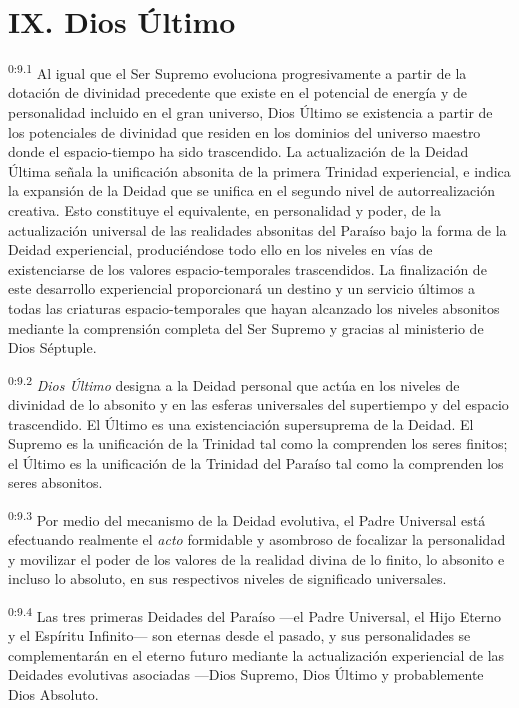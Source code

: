 \section*{IX. Dios Último}
\par
\textsuperscript{0:9.1} Al igual que el Ser Supremo evoluciona progresivamente a partir de la dotación de divinidad precedente que existe en el potencial de energía y de personalidad incluido en el gran universo, Dios Último se existencia a partir de los potenciales de divinidad que residen en los dominios del universo maestro donde el espacio-tiempo ha sido trascendido. La actualización de la Deidad Última señala la unificación absonita de la primera Trinidad experiencial, e indica la expansión de la Deidad que se unifica en el segundo nivel de autorrealización creativa. Esto constituye el equivalente, en personalidad y poder, de la actualización universal de las realidades absonitas del Paraíso bajo la forma de la Deidad experiencial, produciéndose todo ello en los niveles en vías de existenciarse de los valores espacio-temporales trascendidos. La finalización de este desarrollo experiencial proporcionará un destino y un servicio últimos a todas las criaturas espacio-temporales que hayan alcanzado los niveles absonitos mediante la comprensión completa del Ser Supremo y gracias al ministerio de Dios Séptuple.

\par
\textsuperscript{0:9.2} \textit{Dios Último} designa a la Deidad personal que actúa en los niveles de divinidad de lo absonito y en las esferas universales del supertiempo y del espacio trascendido. El Último es una existenciación supersuprema de la Deidad. El Supremo es la unificación de la Trinidad tal como la comprenden los seres finitos; el Último es la unificación de la Trinidad del Paraíso tal como la comprenden los seres absonitos.

\par
\textsuperscript{0:9.3} Por medio del mecanismo de la Deidad evolutiva, el Padre Universal está efectuando realmente el \textit{acto} formidable y asombroso de focalizar la personalidad y movilizar el poder de los valores de la realidad divina de lo finito, lo absonito e incluso lo absoluto, en sus respectivos niveles de significado universales.

\par
\textsuperscript{0:9.4} Las tres primeras Deidades del Paraíso ---el Padre Universal, el Hijo Eterno y el Espíritu Infinito--- son eternas desde el pasado, y sus personalidades se complementarán en el eterno futuro mediante la actualización experiencial de las Deidades evolutivas asociadas ---Dios Supremo, Dios Último y probablemente Dios Absoluto.

